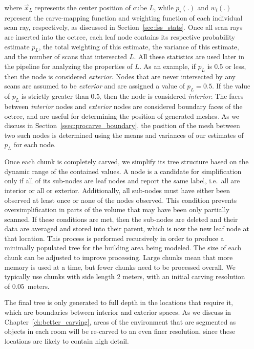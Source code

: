 \documentclass[12pt,onecolumn,oneside]{book}
\begin{document}
where $\vec{x}_L$ represents the center position of cube $L$, while $p_i(.)$ and $w_i(.)$ represent the carve-mapping function and weighting function of each individual scan ray, respectively, as discussed in Section~\ref{sec:fss_stats}.  Once all scan rays are inserted into the octree, each leaf node contains its respective probability estimate $p_L$, the total weighting of this estimate, the variance of this estimate, and the number of scans that intersected $L$.  All these statistics are used later in the pipeline for analyzing the properties of $L$.  As an example, if $p_L$ is $0.5$ or less, then the node is considered {\it exterior}.  Nodes that are never intersected by any scans are assumed to be {\it exterior} and are assigned a value of $p_L=0.5$.  If the value of $p_L$ is strictly greater than $0.5$, then the node is considered {\it interior}.  The faces between {\it interior} nodes and {\it exterior} nodes are considered boundary faces of the octree, and are useful for determining the position of generated meshes.  As we discuss in Section~\ref{ssec:procarve_boundary}, the position of the mesh between two such nodes is determined using the means and variances of our estimates of $p_L$ for each node.

Once each chunk is completely carved, we simplify its tree structure based on the dynamic range of the contained values.  A node is a candidate for simplification only if all of its sub-nodes are leaf nodes and report the same label, i.e.\ all are interior or all or exterior.  Additionally, all sub-nodes must have either been observed at least once or none of the nodes observed.  This condition prevents oversimplification in parts of the volume that may have been only partially scanned.  If these conditions are met, then the sub-nodes are deleted and their data are averaged and stored into their parent, which is now the new leaf node at that location.  This process is performed recursively in order to produce a minimally populated tree for the building area being modeled.  The size of each chunk can be adjusted to improve processing.  Large chunks mean that more memory is used at a time, but fewer chunks need to be processed overall.  We typically use chunks with side length $2$ meters, with an initial carving resolution of $0.05$~meters.

The final tree is only generated to full depth in the locations that require it, which are boundaries between interior and exterior spaces.  As we discuss in Chapter~\ref{ch:better_carving}, areas of the environment that are segmented as objects in each room will be re-carved to an even finer resolution, since these locations are likely to contain high detail.
\end{document}

